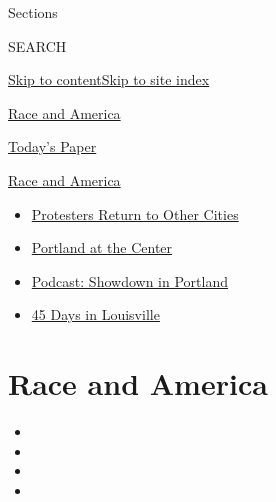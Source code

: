 Sections

SEARCH

\protect\hyperlink{site-content}{Skip to
content}\protect\hyperlink{site-index}{Skip to site index}

\href{https://www.nytimes3xbfgragh.onion/news-event/george-floyd-protests-minneapolis-new-york-los-angeles}{Race
and America}

\href{https://myaccount.nytimes3xbfgragh.onion/auth/login?response_type=cookie\&client_id=vi}{}

\href{https://www.nytimes3xbfgragh.onion/section/todayspaper}{Today's
Paper}

\href{https://www.nytimes3xbfgragh.onion/news-event/george-floyd-protests-minneapolis-new-york-los-angeles?action=click\&pgtype=Article\&state=default\&region=TOP_BANNER\&context=storylines_menu}{Race
and America}

\begin{itemize}
\tightlist
\item
  \href{https://www.nytimes3xbfgragh.onion/2020/07/26/us/protests-portland-seattle-trump.html?action=click\&pgtype=Article\&state=default\&region=TOP_BANNER\&context=storylines_menu}{Protesters
  Return to Other Cities}
\item
  \href{https://www.nytimes3xbfgragh.onion/2020/07/24/us/portland-oregon-protests-white-race.html?action=click\&pgtype=Article\&state=default\&region=TOP_BANNER\&context=storylines_menu}{Portland
  at the Center}
\item
  \href{https://www.nytimes3xbfgragh.onion/2020/07/23/podcasts/the-daily/portland-protests.html?action=click\&pgtype=Article\&state=default\&region=TOP_BANNER\&context=storylines_menu}{Podcast:
  Showdown in Portland}
\item
  \href{https://www.nytimes3xbfgragh.onion/interactive/2020/07/16/us/black-lives-matter-protests-louisville-breonna-taylor.html?action=click\&pgtype=Article\&state=default\&region=TOP_BANNER\&context=storylines_menu}{45
  Days in Louisville}
\end{itemize}

\hypertarget{race-and-america}{%
\section{Race and America}\label{race-and-america}}

\begin{itemize}
\item
\item
\item
\item
\end{itemize}

